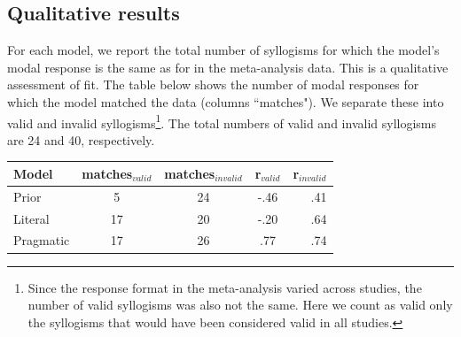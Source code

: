 \documentclass[10pt,letterpaper]{article}
\begin{document}
\subsection{Qualitative results}For each model, we report the total number of syllogisms for which the model's modal response is the same as for in the meta-analysis data. This is a qualitative assessment of fit. The table below shows the number of modal responses for which the model matched the data (columns ``matches"). We separate these into valid and invalid syllogisms\footnote{Since the response format in the meta-analysis varied across studies, the number of valid syllogisms was also not the same. Here we count as valid only the syllogisms that would have been considered valid in all studies.}. The total numbers of valid and invalid syllogisms are 24 and 40, respectively. 
\begin{tabular}{l*{3}{c}r}
Model              & matches$_{valid}$ & matches$_{invalid}$ & r$_{valid}$ & r$_{invalid}$  \\
\hline
Prior & 5 & 24 & -.46 & .41  \\
Literal & 17 & 20 & -.20 & .64  \\
Pragmatic & 17 & 26 & .77 & .74 \\
\end{tabular}
\end{document}
